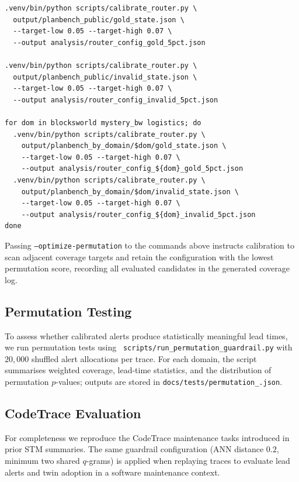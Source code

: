 \documentclass[11pt]{article}
\begin{document}
\begin{lstlisting}[style=stm, caption={Router calibration commands.}, label={lst:calibration}]
.venv/bin/python scripts/calibrate_router.py \
  output/planbench_public/gold_state.json \
  --target-low 0.05 --target-high 0.07 \
  --output analysis/router_config_gold_5pct.json

.venv/bin/python scripts/calibrate_router.py \
  output/planbench_public/invalid_state.json \
  --target-low 0.05 --target-high 0.07 \
  --output analysis/router_config_invalid_5pct.json

for dom in blocksworld mystery_bw logistics; do
  .venv/bin/python scripts/calibrate_router.py \
    output/planbench_by_domain/$dom/gold_state.json \
    --target-low 0.05 --target-high 0.07 \
    --output analysis/router_config_${dom}_gold_5pct.json
  .venv/bin/python scripts/calibrate_router.py \
    output/planbench_by_domain/$dom/invalid_state.json \
    --target-low 0.05 --target-high 0.07 \
    --output analysis/router_config_${dom}_invalid_5pct.json
done
\end{lstlisting}

Passing \texttt{--optimize-permutation} to the commands above instructs
calibration to scan adjacent coverage targets and retain the configuration with
the lowest permutation score, recording all evaluated candidates in the
generated coverage log.

\subsection{Permutation Testing}
\label{subsec:permutation}
To assess whether calibrated alerts produce statistically meaningful lead times,
we run permutation tests using \
\texttt{scripts/run\_permutation\_guardrail.py} with $20{,}000$ shuffled alert
allocations per trace. For each domain, the script summarises weighted coverage,
lead-time statistics, and the distribution of permutation $p$-values; outputs are
stored in \texttt{docs/tests/permutation\_\*.json}.

\subsection{CodeTrace Evaluation}
For completeness we reproduce the CodeTrace maintenance tasks introduced in
prior STM summaries. The same guardrail configuration (ANN distance $0.2$,
minimum two shared $q$-grams) is applied when replaying traces to evaluate lead
alerts and twin adoption in a software maintenance context.
\end{document}
